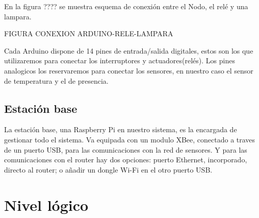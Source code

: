 En la figura ???? se muestra esquema de conexión entre el Nodo, el relé y una lampara.

FIGURA CONEXION ARDUINO-RELE-LAMPARA

Cada Arduino dispone de 14 pines de entrada/salida digitales, estos son los que utilizaremos para conectar los interruptores y actuadores(relés). Los pines analogicos los reservaremos para conectar los sensores, en nuestro caso el sensor de temperatura y el de presencia.


\subsection{Estación base}
La estación base, una  Raspberry Pi en nuestro sistema, es la encargada de gestionar todo el sistema. Va equipada con un modulo XBee, conectado a traves de un puerto USB, para las comunicaciones con la red de sensores. Y para las comunicaciones con el router hay dos opciones: puerto Ethernet, incorporado, directo al router; o añadir un dongle Wi-Fi en el otro puerto USB.








\section{Nivel lógico}

